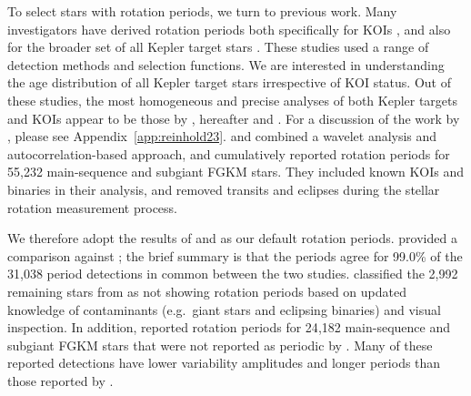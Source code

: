 \documentclass[11pt,twocolumn,tighten,linenumbers]{aastex63}
\begin{document}
To select stars with rotation periods, we turn to previous work.  Many
investigators have derived rotation periods both specifically for KOIs
\citep{McQuillan_2013,Walkowicz_2013,Mazeh_2015,Angus_2018,David_2021},
and also for the broader set of all Kepler target stars
\citep{McQuillan_2014,Reinhold_2015,Santos_2019,Santos_2021,Reinhold2023}.
These studies used a range of detection methods and selection
functions.  We are interested in understanding the age distribution of
all Kepler target stars irrespective of KOI status.  Out of these
studies, the most homogeneous and precise analyses of both Kepler
targets and KOIs appear to be those by
\citet{Santos_2019,Santos_2021}, hereafter 
and .  For a discussion of the work by
\citet{Reinhold2023}, please see Appendix~\ref{app:reinhold23}.
 and  combined a
wavelet analysis and autocorrelation-based approach, and cumulatively
reported rotation periods for 55{,}232 main-sequence and subgiant FGKM
stars.  They included known KOIs and binaries in their analysis, and
removed transits and eclipses during the stellar rotation measurement
process. 

We therefore adopt the results of  and
 as our default rotation periods.
 provided a comparison against
; the brief summary is that the periods
agree for 99.0\% of the 31{,}038 period detections in common between
the two studies.   classified the 2{,}992
remaining stars from  as not showing
rotation periods based on updated knowledge of contaminants
(e.g.~giant stars and eclipsing binaries) and visual inspection.  In
addition,  reported rotation periods for
24{,}182 main-sequence and subgiant FGKM stars that were not reported
as periodic by .  Many of these reported
detections have lower variability amplitudes and longer periods than
those reported by . 
\end{document}
